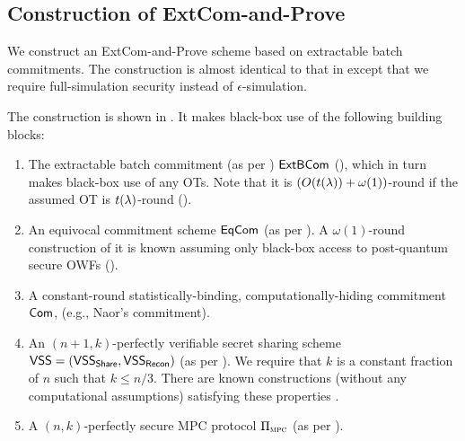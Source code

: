 

\subsection{Construction of ExtCom-and-Prove}
We construct an ExtCom-and-Prove scheme based on extractable batch commitments. The construction is almost identical to that in \cite[Section 6.5]{C:CCLY22} except that we require full-simulation security instead of $\epsilon$-simulation. 

The construction is shown in . It makes black-box use of the following building blocks:
\begin{enumerate}
\item
The extractable batch commitment (as per ) $\mathsf{ExtBCom}$ (), which in turn makes black-box use of any OTs. Note that it is $(O(t(\lambda))+\omega(1))$-round if the assumed OT is $t(\lambda)$-round ().

\item An equivocal commitment scheme $\mathsf{EqCom}$ (as per ). 
A $\omega(1)$-round construction of it is known assuming only black-box access to post-quantum secure OWFs ().  


\item
	A constant-round statistically-binding, computationally-hiding commitment $\mathsf{Com}$, (e.g., Naor's commitment).  %
\item
	An $(n+1,k)$-perfectly verifiable secret sharing scheme $\mathsf{VSS} = (\mathsf{VSS}_{\mathsf{Share}}, \mathsf{VSS}_{\mathsf{Recon}})$ (as per ). We require that $k$ is a constant fraction of $n$ such that  $k \le n/3$. There are known constructions (without any computational assumptions) satisfying these properties \cite{STOC:BenGolWig88,EC:CDDHR99}.
\item
	A $(n,k)$-perfectly secure MPC protocol $\mathrm{\Pi}_\textsc{mpc}$ (as per ).
\end{enumerate}

